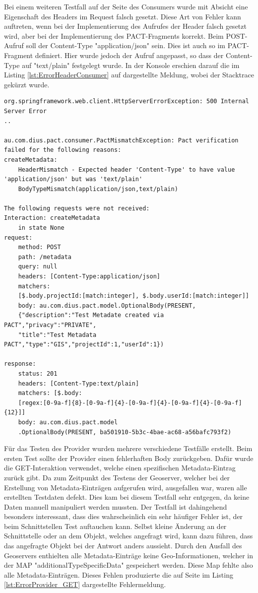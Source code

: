 \documentclass{llncs}
\begin{document}
Bei einem weiteren Testfall auf der Seite des Consumers wurde mit Absicht eine Eigenschaft des Headers im Request falsch gesetzt. Diese Art von Fehler kann auftreten, wenn bei der Implementierung des Aufrufes der Header falsch gesetzt wird, aber bei der Implementierung des PACT-Fragments korrekt. Beim POST-Aufruf soll der Content-Type "application/json" sein. Dies ist auch so im PACT-Fragment definiert. Hier wurde jedoch der Aufruf angepasst, so dass der Content-Type auf "text/plain" festgelegt wurde. In der Konsole erschien darauf die im Listing \ref{lst:ErrorHeaderConsumer} auf \pageref{lst:ErrorHeaderConsumer} dargestellte Meldung, wobei der Stacktrace gekürzt wurde.

\begin{lstlisting}[caption=Fehler im Header,label={lst:ErrorHeaderConsumer}]
org.springframework.web.client.HttpServerErrorException: 500 Internal Server Error
..

au.com.dius.pact.consumer.PactMismatchException: Pact verification failed for the following reasons:
createMetadata:
    HeaderMismatch - Expected header 'Content-Type' to have value 'application/json' but was 'text/plain'
    BodyTypeMismatch(application/json,text/plain)

The following requests were not received:
Interaction: createMetadata
	in state None
request:
	method: POST
	path: /metadata
	query: null
	headers: [Content-Type:application/json]
	matchers: 
	[$.body.projectId:[match:integer], $.body.userId:[match:integer]]
	body: au.com.dius.pact.model.OptionalBody(PRESENT, 
	{"description":"Test Metadate created via PACT","privacy":"PRIVATE",
	"title":"Test Metadata PACT","type":"GIS","projectId":1,"userId":1})

response:
	status: 201 
	headers: [Content-Type:text/plain] 
	matchers: [$.body:
	[regex:[0-9a-f]{8}-[0-9a-f]{4}-[0-9a-f]{4}-[0-9a-f]{4}-[0-9a-f]{12}]] 
	body: au.com.dius.pact.model
	.OptionalBody(PRESENT, ba501910-5b3c-4bae-ac68-a56bafc793f2)
\end{lstlisting}

Für das Testen des Provider wurden mehrere verschiedene Testfälle erstellt. Beim ersten Test sollte der Provider einen fehlerhaften Body zurückgeben. Dafür wurde die GET-Interaktion verwendet, welche einen spezifischen Metadata-Eintrag zurück gibt. Da zum Zeitpunkt des Testens der Geoserver, welcher bei der Erstellung von Metadata-Einträgen aufgerufen wird,  ausgefallen war, waren alle erstellten Testdaten defekt. Dies kam bei diesem Testfall sehr entgegen, da keine Daten manuell manipuliert werden mussten. Der Testfall ist dahingehend besonders interessant, dass dies wahrscheinlich ein sehr häufiger Fehler ist, der beim Schnittstellen Test auftauchen kann. Selbst kleine Änderung an der Schnittstelle oder an dem Objekt, welches angefragt wird, kann dazu führen, dass das angefragte Objekt bei der Antwort anders aussieht. 
Durch den Ausfall des Geoservers enthielten alle Metadata-Einträge keine Geo-Informationen, welcher in der MAP "additionalTypeSpecificData" gespeichert werden. Diese Map fehlte also alle Metadata-Einträgen. Dieses Fehlen produzierte die auf Seite \pageref{lst:ErrorProvider_GET} im Listing \ref{lst:ErrorProvider_GET} dargestellte Fehlermeldung.
\end{document}
